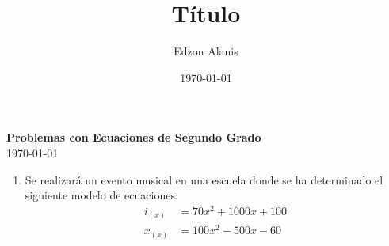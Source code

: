 \documentclass[12pt]{article}
\title{Título}
\author{Edzon Alanis}
\date{\today}
\begin{document}

\begin{center}
    \textbf{\large Problemas con Ecuaciones de Segundo Grado} \\[0.4cm]
    \today
\end{center}

\vspace*{5mm}

\begin{enumerate}
    \item Se realizará un evento musical en una escuela donde se ha determinado el
    siguiente modelo de ecuaciones: \begin{align*}
        i_{(x)} &= 70x^2+1000x+100 \\
        x_{(x)} &= 100x^2-500x-60
    \end{align*}
\end{enumerate}


\end{document}
